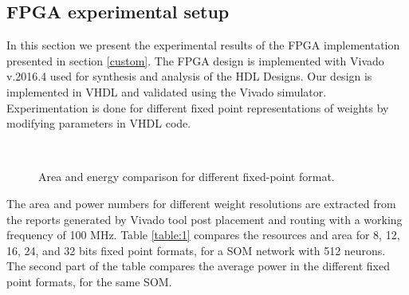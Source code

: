 \subsection{FPGA experimental setup}\label{fpga_results}
In this section we present the experimental results of the FPGA implementation presented in section \ref{custom}. The FPGA design is implemented with Vivado v.2016.4 used for synthesis and analysis of the HDL Designs. Our design is implemented in VHDL and validated using the Vivado simulator. Experimentation is done for different fixed point representations of weights by modifying parameters in VHDL code. 
\begin{figure*}[hb]
	\centering
	~
	\caption{ Area and energy comparison for different fixed-point format.}
	\label{fig:metrics}
\end{figure*}

The area and power numbers for different weight resolutions are extracted from the reports generated by Vivado tool post placement and routing with a working frequency of 100 MHz.
Table \ref{table:1} compares the resources and area for 8, 12, 16, 24, and 32 bits fixed point formats, for a SOM network with 512 neurons. The second part of the table compares the average power in the different fixed point formats, for the same SOM.

